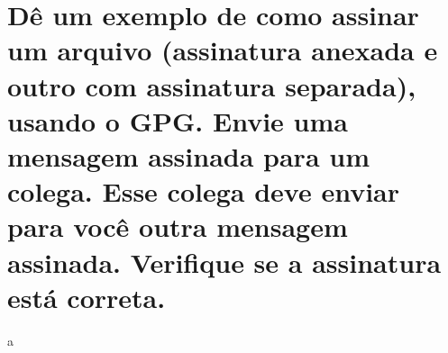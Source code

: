 \documentclass[
    article,            %
    11pt,               %
    oneside,            %
    a4paper,            %
    english,            %
    brazil,             %
    sumario=tradicional,
    ]{abntex2}
\begin{document}
\section{Dê um exemplo de como assinar um arquivo (assinatura anexada e outro com assinatura separada), usando o GPG. Envie uma mensagem assinada para um colega. Esse colega deve enviar para você outra mensagem assinada. Verifique se a assinatura está correta.}
a
% 


\postextual

\nocite{GnuPrivacyGuardHowto}

\end{document}
